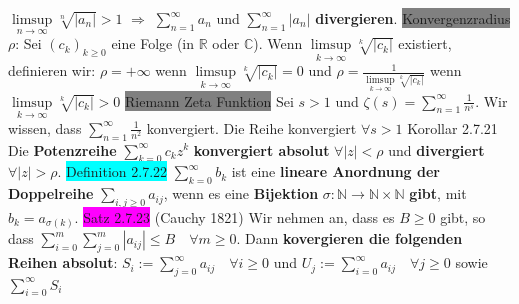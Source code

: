 \documentclass[landscape, 10pt]{article}
\newcommand{\R}{\mathbb{R}}
\newcommand{\N}{\mathbb{N}}
\newcommand{\C}{\mathbb{C}}
\begin{document}
\begin{multicols}{3}
                \textcolor{NavyBlue}{$\limsup\limits_{n\to\infty}\sqrt[n]{|a_n|}>1$}
                $\Longrightarrow$
                \textcolor{NavyBlue}{$\sum_{n=1}^\infty a_n$} und 
                \textcolor{NavyBlue}{$\sum_{n=1}^\infty |a_n|$}
                \textbf{divergieren}.
\colorbox{gray}{Konvergenzradius} \textcolor{NavyBlue}{$\rho$}: 
                Sei \textcolor{NavyBlue}{$(c_k)_{k\geqslant0}$} eine Folge 
                (in $\R$ oder $\C$). Wenn 
                \textcolor{NavyBlue}{$\limsup\limits_{k\to\infty}\sqrt[k]{|c_k|}$} 
                existiert, definieren wir: 
         \textcolor{NavyBlue}{$\rho=+\infty$}
                wenn \textcolor{NavyBlue}{$\limsup\limits_{k\to\infty}\sqrt[k]{|c_k|}=0$}
                und 
                \textcolor{NavyBlue}{$\rho=\frac{1}{\limsup\limits_{k\to\infty}\sqrt[k]{|c_k|}}$}
                wenn 
                \textcolor{NavyBlue}{$\limsup\limits_{k\to\infty}\sqrt[k]{|c_k|} >0$}
\colorbox{gray}{Riemann Zeta Funktion} Sei $s>1$ und 
                $\zeta(s)=\sum_{n=1}^\infty\frac{1}{n^s}$.
                Wir wissen, dass
                $\sum_{n=1}^\infty\frac{1}{n^2}$ konvergiert.
                Die Reihe 
                konvergiert $\forall s>1$
\colorbox{BurntOrange}{Korollar 2.7.21} Die \textbf{Potenzreihe}
                \textcolor{NavyBlue}{$\sum_{k=0}^\infty c_kz^k$}
                \textbf{konvergiert absolut} 
                \textcolor{NavyBlue}{$\forall |z|<\rho$} und \textbf{divergiert} 
                \textcolor{NavyBlue}{$\forall |z|>\rho$}.
\colorbox{cyan}{Definition 2.7.22} \textcolor{NavyBlue}{$\sum_{k=0}^\infty b_k$}
                ist eine \textbf{lineare Anordnung der Doppelreihe} 
                \textcolor{NavyBlue}{$\sum_{i,j\geqslant0}a_{ij}$}, wenn es eine 
         \textbf{Bijektion} 
                \textcolor{NavyBlue}{$\sigma:\N\longrightarrow\N\times\N$}
                \textbf{gibt}, mit \textcolor{NavyBlue}{$b_k=a_{\sigma(k)}$}.
\colorbox{magenta}{Satz 2.7.23} (Cauchy 1821) Wir nehmen an, dass es 
                \textcolor{NavyBlue}{$B\geqslant0$} gibt, so dass 
                \textcolor{NavyBlue}{
                $\sum_{i=0}^m\sum_{j=0}^m|a_{ij}|\leqslant B\quad\forall m\geqslant0$}.
                Dann 
         \textbf{kovergieren die folgenden Reihen absolut}: 
                \textcolor{NavyBlue}{$S_i:=\sum_{j=0}^\infty a_{ij}\quad\forall i\geqslant0$} 
                und 
                \textcolor{NavyBlue}{$U_j:=\sum_{i=0}^\infty a_{ij}\quad\forall j\geqslant0$}
                sowie 
         \textcolor{NavyBlue}{$\sum_{i=0}^\infty S_i$} 

\end{multicols}
\end{document}
